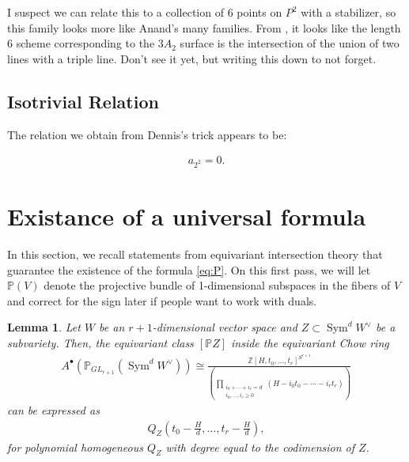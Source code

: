 \documentclass[12 pt]{amsart}
\newtheorem{lemma}{Lemma}[section]
\newcommand{\<}{\left\langle}
\renewcommand{\>}{\right\rangle}
\begin{document}
{\color{red} I suspect we can relate this to a collection of 6 points on $P^2$ with a stabilizer, so this family looks more like Anand's many families. From \cite[Proposition 3.3]{N05}, it looks like the length 6 scheme corresponding to the $3A_2$ surface is the intersection of the union of two lines with a triple line. Don't see it yet, but writing this down to not forget.}

\subsection{Isotrivial Relation}
\label{sec:isotrivial-relation}

The relation we obtain from Dennis's trick appears to be:

\begin{align}
  \label{eq:relationDennis}
  a_{2^{2}} = 0.
\end{align}

\appendix

\section{Existance of a universal formula}

In this section, we recall statements from equivariant intersection theory that guarantee the existence of the formula \eqref{eq:P}. On this first pass, we will let $\mathbb{P}(V)$ denote the projective bundle of 1-dimensional subspaces in the fibers of $V$ and correct for the sign later if people want to work with duals. 

\begin{lemma}
\label{lem:Q_Zclass}
Let $W$ be an $r+1$-dimensional vector space and $Z\subset \operatorname{Sym}^d W^{\vee}$ be a subvariety. Then, the equivariant class $[\mathbb{P}Z]$ inside the equivariant Chow ring 
\begin{align}
    A^{\bullet}(\mathbb{P}_{GL_{r+1}}(\operatorname{Sym}^d W^{\vee}))\cong \frac{\mathbb{Z}[H, t_0,\ldots,t_{r}]^{S^{r+1}}}{\left(\displaystyle\prod_{\substack{i_0+\cdots+i_{r}=d\\ i_0,\ldots,i_r\geq 0}}(H-i_0 t_0 - \cdots - i_r t_r)\right)}\label{eq:equivariantSym}
\end{align}
can be expressed as
\begin{align*}
    Q_Z(t_0-\frac{H}{d},\ldots,t_{r}-\frac{H}{d}),
\end{align*}
for polynomial homogeneous $Q_Z$ with degree equal to the codimension of $Z$. 
\end{lemma}
\end{document}
